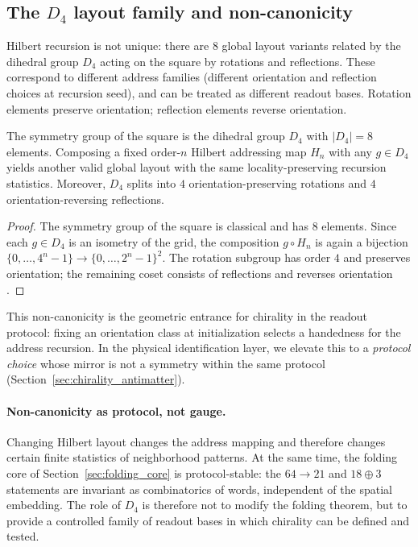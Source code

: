 \subsection{The \texorpdfstring{$D_4$}{D4} layout family and non-canonicity}
\label{subsec:d4_family}

Hilbert recursion is not unique: there are $8$ global layout variants related by the dihedral group $D_4$ acting on the square by rotations and reflections.
These correspond to different address families (different orientation and reflection choices at recursion seed), and can be treated as different readout bases.
Rotation elements preserve orientation; reflection elements reverse orientation.

\begin{lemma}\label{lem:d4_layouts}
The symmetry group of the square is the dihedral group $D_4$ with $|D_4|=8$ elements.
Composing a fixed order-$n$ Hilbert addressing map $H_n$ with any $g\in D_4$ yields another valid global layout with the same locality-preserving recursion statistics.
Moreover, $D_4$ splits into $4$ orientation-preserving rotations and $4$ orientation-reversing reflections.
\end{lemma}
\begin{proof}
The symmetry group of the square is classical and has $8$ elements.
Since each $g\in D_4$ is an isometry of the grid, the composition $g\circ H_n$ is again a bijection $\{0,\dots,4^n-1\}\to\{0,\dots,2^n-1\}^2$.
The rotation subgroup has order $4$ and preserves orientation; the remaining coset consists of reflections and reverses orientation \cite{Sagan1994}.
\end{proof}

This non-canonicity is the geometric entrance for chirality in the readout protocol:
fixing an orientation class at initialization selects a handedness for the address recursion.
In the physical identification layer, we elevate this to a \emph{protocol choice} whose mirror is not a symmetry within the same protocol (Section~\ref{sec:chirality_antimatter}).

\paragraph{Non-canonicity as protocol, not gauge.}
Changing Hilbert layout changes the address mapping and therefore changes certain finite statistics of neighborhood patterns.
At the same time, the folding core of Section~\ref{sec:folding_core} is protocol-stable: the $64\to 21$ and $18\oplus 3$ statements are invariant as combinatorics of words, independent of the spatial embedding.
The role of $D_4$ is therefore not to modify the folding theorem, but to provide a controlled family of readout bases in which chirality can be defined and tested.

